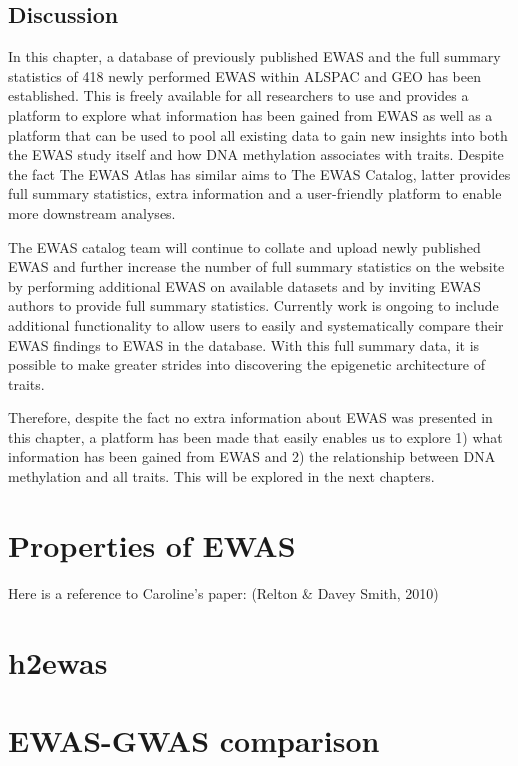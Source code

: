 \documentclass[11pt,twoside]{bristolthesis}
\begin{document}
\hypertarget{discussion}{%
\section{Discussion}\label{discussion}}

In this chapter, a database of previously published EWAS and the full summary statistics of 418 newly performed EWAS within ALSPAC and GEO has been established. This is freely available for all researchers to use and provides a platform to explore what information has been gained from EWAS as well as a platform that can be used to pool all existing data to gain new insights into both the EWAS study itself and how DNA methylation associates with traits. Despite the fact The EWAS Atlas has similar aims to The EWAS Catalog, latter provides full summary statistics, extra information and a user-friendly platform to enable more downstream analyses.

The EWAS catalog team will continue to collate and upload newly published EWAS and further increase the number of full summary statistics on the website by performing additional EWAS on available datasets and by inviting EWAS authors to provide full summary statistics. Currently work is ongoing to include additional functionality to allow users to easily and systematically compare their EWAS findings to EWAS in the database. With this full summary data, it is possible to make greater strides into discovering the epigenetic architecture of traits.

Therefore, despite the fact no extra information about EWAS was presented in this chapter, a platform has been made that easily enables us to explore 1) what information has been gained from EWAS and 2) the relationship between DNA methylation and all traits. This will be explored in the next chapters.

\hypertarget{properties-of-ewas}{%
\chapter{Properties of EWAS}\label{properties-of-ewas}}

Here is a reference to Caroline's paper: (Relton \& Davey Smith, 2010)

\hypertarget{h2ewas-chapter}{%
\chapter{h2ewas}\label{h2ewas-chapter}}

\hypertarget{ewas-gwas-comp-chapter}{%
\chapter{EWAS-GWAS comparison}\label{ewas-gwas-comp-chapter}}
\end{document}
